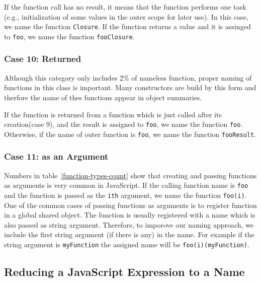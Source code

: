 \documentclass[10pt, preprint]{sigplanconf}
\begin{document}
{If the function call has no result, it means that the function performs one task (e.g., initialization of some values in the outer scope for later use). In this case, we name the function {\small\texttt{Closure}}. If the function returns a value and it is assinged to {\small\texttt{foo}}, we name the function {\small\texttt{fooClosure}}.

\subsubsection{Case 10: Returned}
Although this category only includes 2\% of nameless function, proper naming of functions in this class is important. Many constructors are build by this form and therfore the name of thes functions appear in object summaries.

If the function is returned from a function which is just called after its creation(case 9), and the result is assigned to {\small\texttt{foo}}, we name the function {\small\texttt{foo}}. Otherwise, if the name of outer function is {\small\texttt{foo}}, we name the function {\small\texttt{fooResult}}.


\subsubsection{Case 11: as an Argument}
Numbers in table~\ref{function-types-count} show that creating and passing functions as arguments is very common in JavaScript. If the calling function name is 
{\small\texttt{foo}} and the function is passed as the {\small\texttt{ith}} argument, we name the function {\small\texttt{foo(i)}}. One of the common cases of passing
functions as arguments is to register function in a global shared object. The function is usually registered with a name which is also passed as string argument. Therefore, to imporove our naming approach, we include the first string argument (if there is any) in the name. For example if the string argument is {\small\texttt{myFunction}} the assigned name will be {\small\texttt{foo(i)(myFunction)}}.


\subsection{Reducing a JavaScript Expression to a Name}
\label{sec:general-element-naming}



}
\end{document}
